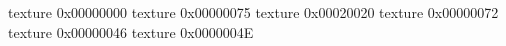 texture 0x00000000
texture 0x00000075
texture 0x00020020
texture 0x00000072
texture 0x00000046
texture 0x0000004E